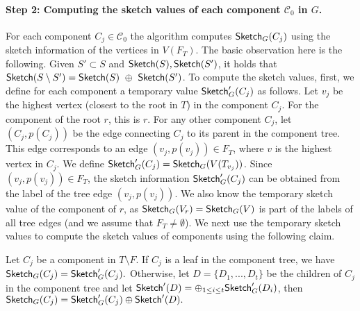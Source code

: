 \paragraph{Step 2: Computing the sketch values of each component $\mathcal{C}_0$ in $G$.} 
For each component $C_j \in \mathcal{C}_0$ the algorithm computes $\mathsf{Sketch}_G(C_j)$ using the sketch information of the vertices in $V(F_T)$.  The basic observation here is the following. Given $S' \subset S$ and $\mathsf{Sketch}(S), \mathsf{Sketch}(S')$, it holds that $\mathsf{Sketch}(S \setminus S')=\mathsf{Sketch}(S) ~\oplus~ \mathsf{Sketch}(S')$. To compute the sketch values, first, we define for each component a temporary value $\mathsf{Sketch}'_G(C_j)$ as follows. Let $v_j$ be the highest vertex (closest to the root in $T$) in the component $C_j$. For the component of the root $r$, this is $r$. For any other component $C_j$, let $(C_j,p(C_j))$ be the edge connecting $C_j$ to its parent in the component tree. This edge corresponds to an edge $(v_j,p(v_j)) \in F_T$, where $v$ is the highest vertex in $C_j$. We define $\mathsf{Sketch}'_G(C_j) = \mathsf{Sketch}_G(V(T_{v_j}))$. %
Since $(v_j,p(v_j)) \in F_T$, the sketch information $\mathsf{Sketch}'_G(C_j)$ can be obtained from the label of the tree edge $(v_j,p(v_j))$. We also know the temporary sketch value of the component of $r$, as $\mathsf{Sketch}_G(V_{r})=\mathsf{Sketch}_G(V)$ is part of the labels of all tree edges (and we assume that $F_T \neq \emptyset$). We next use the temporary sketch values to compute the sketch values of components using the following claim.

\begin{claim}
Let $C_j$ be a component in $T \setminus F$. If $C_j$ is a leaf in the component tree, we have $\mathsf{Sketch}_G(C_j) = \mathsf{Sketch}'_G(C_j).$ Otherwise, let $D=\{D_1,...,D_t\}$ be the children of $C_j$ in the component tree and let $\mathsf{Sketch}'(D)=\oplus_{1 \leq i \leq t} \mathsf{Sketch}'_G(D_i)$, then $\mathsf{Sketch}_G(C_j) = \mathsf{Sketch}'_G(C_j) \oplus \mathsf{Sketch}'(D).$ 
\end{claim}

